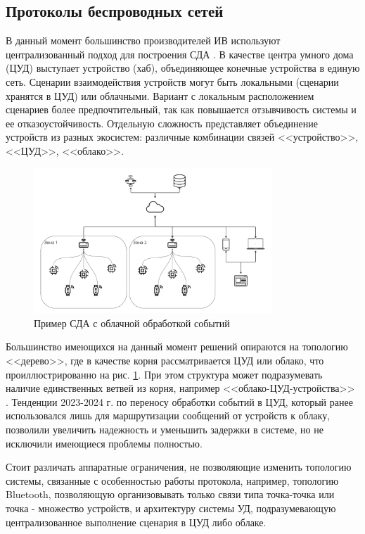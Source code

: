 \documentclass[a4paper,12pt]{article}
\begin{document}
\subsection{Протоколы беспроводных сетей}
В данный момент большинство производителей ИВ используют централизованный подход для построения СДА \cite{Rus_alternative}. В качестве центра умного дома (ЦУД) выступает устройство (хаб), объединяющее конечные устройства в единую сеть. Сценарии взаимодействия устройств могут быть локальными (сценарии хранятся в ЦУД) или облачными. Вариант с локальным расположением сценариев более предпочтительный, так как повышается отзывчивость системы и ее отказоустойчивость. Отдельную сложность представляет объединение устройств из разных экосистем: различные комбинации связей <<устройство>>, <<ЦУД>>, <<облако>>.
\begin{figure}[h]
    \centering
    \includegraphics[width=0.8\textwidth]{images/CommertialAlternativeDesign.png}
    \caption{Пример СДА с облачной обработкой событий}
    \label{fig:cloud_event_processing}
\end{figure}

Большинство имеющихся на данный момент решений опираются на топологию <<дерево>>, где в качестве корня рассматривается ЦУД или облако, что проиллюстрированно на рис. \ref{fig:cloud_event_processing}. При этом структура может подразумевать наличие единственных ветвей из корня, например <<облако-ЦУД-устройства>> \cite{smart_home_review}. Тенденции 2023-2024 г. по переносу обработки событий в ЦУД, который ранее использовался лишь для маршрутизации сообщений от устройств к облаку, позволили увеличить надежность и уменьшить задержки в системе, но не исключили имеющиеся проблемы полностью.

Стоит различать аппаратные ограничения, не позволяющие изменить топологию системы, связанные с особенностью работы протокола, например, топологию Bluetooth, позволяющую организовывать только связи типа точка-точка или точка - множество устройств, и архитектуру системы УД, подразумевающую централизованное выполнение сценария в ЦУД либо облаке.
\end{document}
